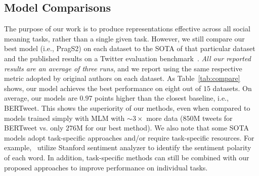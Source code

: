 \vspace{-5pt}
\subsection{Model Comparisons}\label{subsec:comparisons}
The purpose of our work is to produce representations effective across all social meaning tasks, rather than a single given task. However, we still compare our best model (i.e., PragS2) on each dataset to the SOTA of that particular dataset and the published results on a Twitter evaluation benchmark~\cite{barbieri-2020-tweeteval}. \textit{All our reported results are an average of three runs}, and we report using the same respective metric adopted by original authors on each dataset. As Table~\ref{tab:compare} shows, our model achieves the best performance on eight out of $15$ datasets. On average, our models are $0.97$ points higher than the closest baseline, i.e., BERTweet. This shows the superiority of our methods, even when compared to models trained simply with MLM with $\sim3 \times$ more data ($850$M tweets for BERTweet vs. only $276$M for our best method). We also note that some SOTA models adopt task-specific approaches and/or require task-specific resources. For example,~\citet{bamman2015contextualized} utilize Stanford sentiment analyzer to identify the sentiment polarity of each word. In addition, task-specific methods can still be combined with our proposed approaches to improve performance on individual tasks.




